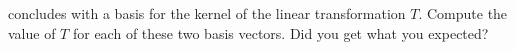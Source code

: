 concludes with a basis for the kernel of the linear transformation $T$.  Compute the value of $T$ for each of these two basis vectors.  Did you get what you expected?